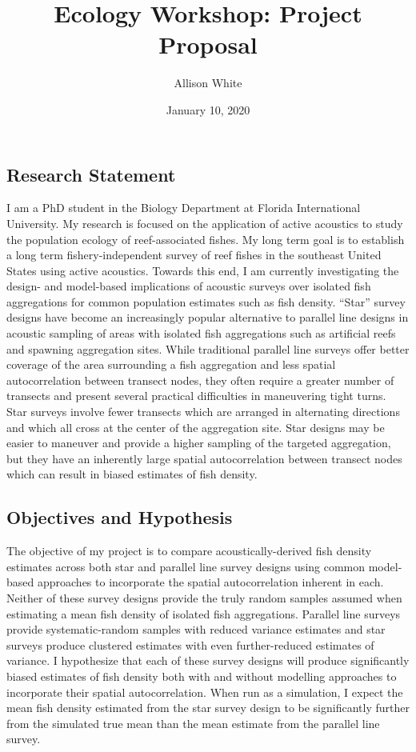 \documentclass[]{article}
\title{Ecology Workshop: Project Proposal}
\author{Allison White}
\date{January 10, 2020}
\begin{document}
\maketitle

\subsection{Research Statement}\label{research-statement}

I am a PhD student in the Biology Department at Florida International
University. My research is focused on the application of active
acoustics to study the population ecology of reef-associated fishes. My
long term goal is to establish a long term fishery-independent survey of
reef fishes in the southeast United States using active acoustics.
Towards this end, I am currently investigating the design- and
model-based implications of acoustic surveys over isolated fish
aggregations for common population estimates such as fish density.
``Star'' survey designs have become an increasingly popular alternative
to parallel line designs in acoustic sampling of areas with isolated
fish aggregations such as artificial reefs and spawning aggregation
sites. While traditional parallel line surveys offer better coverage of
the area surrounding a fish aggregation and less spatial autocorrelation
between transect nodes, they often require a greater number of transects
and present several practical difficulties in maneuvering tight turns.
Star surveys involve fewer transects which are arranged in alternating
directions and which all cross at the center of the aggregation site.
Star designs may be easier to maneuver and provide a higher sampling of
the targeted aggregation, but they have an inherently large spatial
autocorrelation between transect nodes which can result in biased
estimates of fish density.

\subsection{Objectives and Hypothesis}\label{objectives-and-hypothesis}

The objective of my project is to compare acoustically-derived fish
density estimates across both star and parallel line survey designs
using common model-based approaches to incorporate the spatial
autocorrelation inherent in each. Neither of these survey designs
provide the truly random samples assumed when estimating a mean fish
density of isolated fish aggregations. Parallel line surveys provide
systematic-random samples with reduced variance estimates and star
surveys produce clustered estimates with even further-reduced estimates
of variance. I hypothesize that each of these survey designs will
produce significantly biased estimates of fish density both with and
without modelling approaches to incorporate their spatial
autocorrelation. When run as a simulation, I expect the mean fish
density estimated from the star survey design to be significantly
further from the simulated true mean than the mean estimate from the
parallel line survey.
\end{document}
